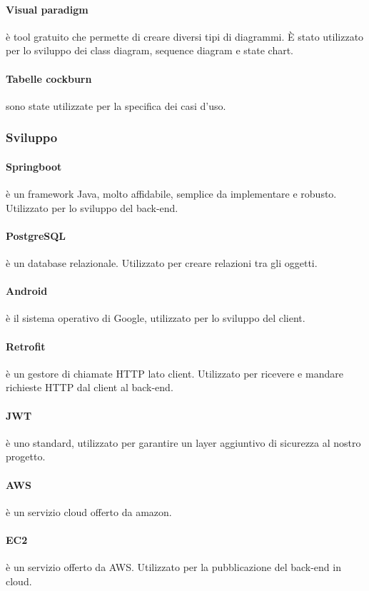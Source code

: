 \paragraph{Visual paradigm} è tool gratuito che permette di creare diversi tipi di diagrammi. \`{E} stato utilizzato per lo sviluppo dei class diagram, sequence diagram e state chart.
\paragraph{Tabelle cockburn} sono state utilizzate per la specifica dei casi d'uso.
\subsubsection{Sviluppo}
\paragraph{Springboot} è un framework Java, molto affidabile, semplice da implementare e robusto. Utilizzato per lo sviluppo del back-end.
\paragraph{PostgreSQL} è un database relazionale. Utilizzato per creare relazioni tra gli oggetti.
\paragraph{Android} è il sistema operativo di Google, utilizzato per lo sviluppo del client.
\paragraph{Retrofit} è un gestore di chiamate HTTP lato client. Utilizzato per ricevere e mandare richieste HTTP dal client al back-end. 
\paragraph{JWT} è uno standard, utilizzato per garantire un layer aggiuntivo di sicurezza al nostro progetto.
\paragraph{AWS} è un servizio cloud offerto da amazon.
\paragraph{EC2} è un servizio offerto da AWS. Utilizzato per la pubblicazione del back-end in cloud.
